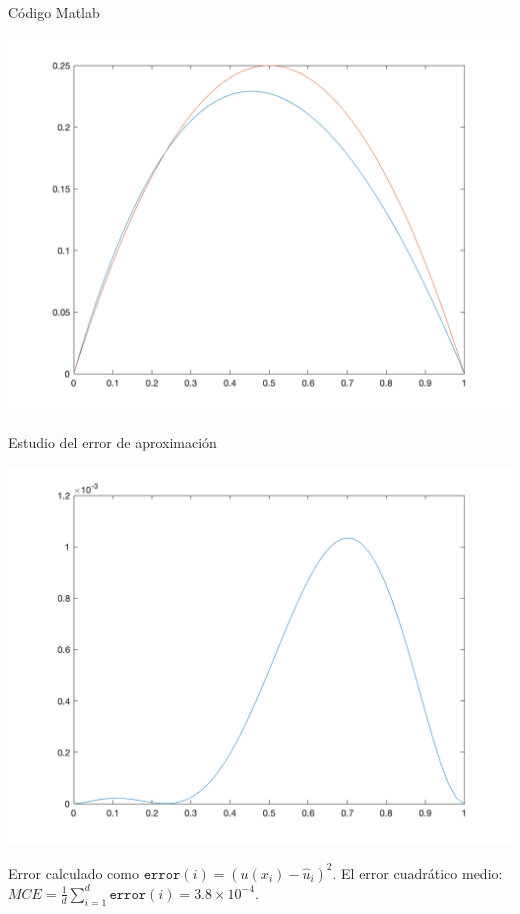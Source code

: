 \documentclass[10pt,handout]{beamer}
\theoremstyle{plain} %
\theoremstyle{plain} %
\theoremstyle{plain} %
\theoremstyle{plain} %
\theoremstyle{definition}
\theoremstyle{example}
\theoremstyle{example}
\theoremstyle{remark}
\theoremstyle{remark}
\begin{document}
\begin{frame}{Código Matlab}

\end{frame}

\begin{frame}
\begin{center}
\includegraphics[scale=0.2]{grafica1.png}
\end{center}
\end{frame}

\begin{frame}{Estudio del error de aproximación}
\begin{center}
\includegraphics[scale=0.15]{grafica2.png}
\end{center}
Error calculado como $\texttt{error}(i)=(u(x_i)-\widehat{u}_i)^2$. El error
cuadrático medio: $MCE = \frac{1}{d} \sum_{i=1}^d\texttt{error}(i) = 3.8 \times 10^{-4}.$
\end{frame}
\end{document}
